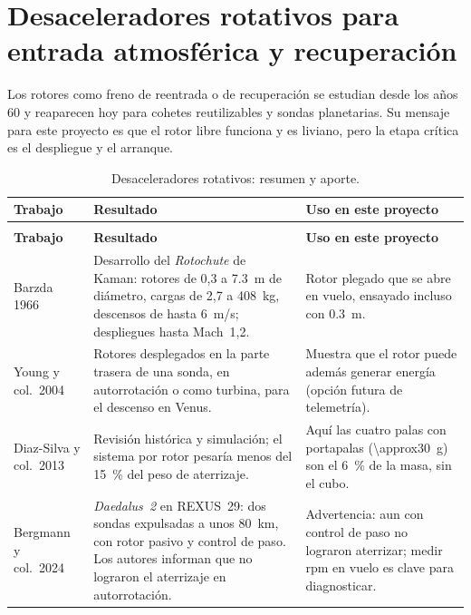 \section{Desaceleradores rotativos para entrada atmosférica y recuperación}
\label{sec:literatura-decel}
Los rotores como freno de reentrada o de recuperación se estudian desde los años 60 y
reaparecen hoy para cohetes reutilizables y sondas planetarias. Su mensaje para este
proyecto es que el rotor libre funciona y es liviano, pero la etapa crítica es el
despliegue y el arranque.

{\footnotesize
\begin{longtable}{@{}>{\raggedright\arraybackslash}p{2.6cm} >{\raggedright\arraybackslash}p{\dimexpr(\textwidth-2.6cm-4\tabcolsep)/2\relax} >{\raggedright\arraybackslash}p{\dimexpr(\textwidth-2.6cm-4\tabcolsep)/2\relax}@{}}
\caption{Desaceleradores rotativos: resumen y aporte.}\label{tab:literatura-decel}\\
\toprule
\textbf{Trabajo} & \textbf{Resultado} & \textbf{Uso en este proyecto}\\\midrule
\endfirsthead
\multicolumn{3}{@{}l}{\emph{Tabla~\thetable\ (continuación)}}\\\toprule
\textbf{Trabajo} & \textbf{Resultado} & \textbf{Uso en este proyecto}\\\midrule
\endhead
\bottomrule
\endlastfoot
Barzda 1966~\cite{literatura-barzda1966} & Desarrollo del \emph{Rotochute} de Kaman: rotores de 0,3 a \SI{7.3}{m} de diámetro, cargas de 2,7 a \SI{408}{kg}, descensos de hasta \SI{6}{m/s}; despliegues hasta Mach~1,2. & Rotor plegado que se abre en vuelo, ensayado incluso con \SI{0.3}{m}.\\
Young y col.\ 2004~\cite{literatura-young2004} & Rotores desplegados en la parte trasera de una sonda, en autorrotación o como turbina, para el descenso en Venus. & Muestra que el rotor puede además generar energía (opción futura de telemetría).\\
Diaz-Silva y col.\ 2013~\cite{literatura-diazsilva2013} & Revisión histórica y simulación; el sistema por rotor pesaría menos del \SI{15}{\percent} del peso de aterrizaje. & Aquí las cuatro palas con portapalas (\SI{\approx30}{g}) son el \SI{6}{\percent} de la masa, sin el cubo.\\
Bergmann y col.\ 2024~\cite{literatura-bergmann2024} & \emph{Daedalus~2} en REXUS~29: dos sondas expulsadas a unos \SI{80}{km}, con rotor pasivo y control de paso. Los autores informan que no lograron el aterrizaje en autorrotación. & Advertencia: aun con control de paso no lograron aterrizar; medir rpm en vuelo es clave para diagnosticar.\\

\end{longtable}}

